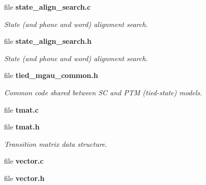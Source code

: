 \begin{DoxyCompactItemize}
file {\bf state\-\_\-align\-\_\-search.\-c}
\begin{DoxyCompactList}\small\item\em State (and phone and word) alignment search. \end{DoxyCompactList}\item 
file {\bf state\-\_\-align\-\_\-search.\-h}
\begin{DoxyCompactList}\small\item\em State (and phone and word) alignment search. \end{DoxyCompactList}\item 
file {\bf tied\-\_\-mgau\-\_\-common.\-h}
\begin{DoxyCompactList}\small\item\em Common code shared between S\-C and P\-T\-M (tied-\/state) models. \end{DoxyCompactList}\item 
file {\bfseries tmat.\-c}
\item 
file {\bf tmat.\-h}
\begin{DoxyCompactList}\small\item\em Transition matrix data structure. \end{DoxyCompactList}\item 
file {\bfseries vector.\-c}
\item 
file {\bfseries vector.\-h}
\end{DoxyCompactItemize}
